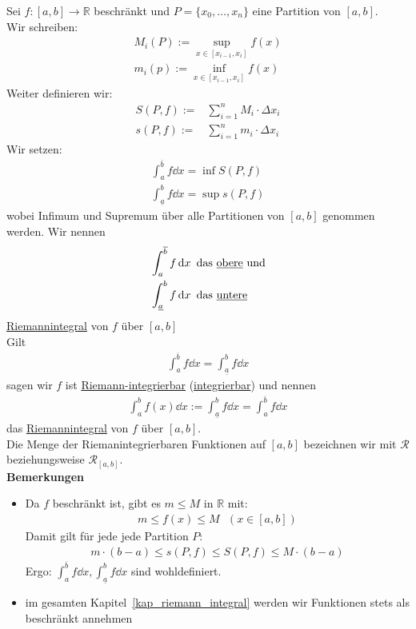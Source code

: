 \begin{Definition}{ \label{def_riemann-integrierbar}
	Sei $f : [a,b] \rightarrow \mathbb{R}$ beschränkt und $P = \{x_0, \hdots, x_n\}$ 
	eine Partition von $[a,b]$.\\
	Wir schreiben: 
	\begin{align*}
		M_i(P) := \sup_{x \in [x_{i-1}, x_i]} f(x) \\
		m_i(p) := \inf_{x \in [x_{i-1}, x_i]} f(x)
	\end{align*}
	Weiter definieren wir: 
	\begin{align*}
		S(P,f) := & \sum_{i=1}^n M_i \cdot \Delta x_i \\
		s(P,f) := & \sum_{i=1}^n m_i \cdot \Delta x_i
	\end{align*}
	Wir setzen:
	\begin{align*}
		\int_a^{\overline{b}} f \dd{x} = \inf S(P,f) \\
		\int_{\underline{a}}^b f \dd{x} = \sup s(P,f)
	\end{align*}
	wobei Infimum und Supremum über alle Partitionen von $[a,b]$ genommen werden. 
	Wir nennen 
	\begin{align*}
		& \int_a^{\overline{b}} f \dd{x} \text{ das \underline{obere} und} \\
		& \int_{\underline{a}}^b f \dd{x} \text{ das \underline{untere}}
	\end{align*}
	\underline{Riemannintegral} von $f$ über $[a,b]$ \\
	Gilt 
	\begin{align*}
		\int_a^{\overline{b}} f \dd{x} = \int_{\underline{a}}^b f \dd{x}
	\end{align*}
	sagen wir $f$ ist \underline{Riemann-integrierbar} (\underline{integrierbar}) 
	und nennen 
	\begin{align*}
		\int_a^b f(x) \dd{x} := \int_{\underline{a}}^b f \dd{x} = 
		\int_a^{\overline{b}} f \dd{x}
	\end{align*}
	das \underline{Riemannintegral} von $f$ über $[a,b]$.\\
	Die Menge der Riemanintegrierbaren Funktionen auf $[a,b]$ bezeichnen wir 
	mit $\mathcal{R}$ beziehungsweise $\mathcal{R}_{[a,b]}$.\\
	
	\textbf{Bemerkungen}
	\begin{itemize}
		\item Da $f$ beschränkt ist, gibt es $m \leq M$ in $\mathbb{R}$ mit:
		\begin{align*}
			m \leq f(x) \leq M \text{ }(x \in [a,b])
		\end{align*}
		Damit gilt für jede jede Partition $P$: 
		\begin{align*}
			m \cdot (b-a) \leq s(P,f) \leq S(P,f) \leq M \cdot (b-a)
		\end{align*}
		Ergo: $\int_a^{\overline{b}} f \dd{x} , \int_{\underline{a}}^b f \dd{x}$ 
		sind wohldefiniert.
		\item im gesamten Kapitel~\ref{kap_riemann_integral}
		werden wir Funktionen stets als 
		beschränkt annehmen
	\end{itemize}
	
}\end{Definition}

